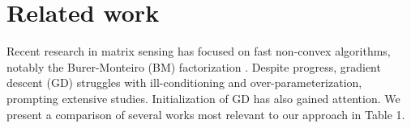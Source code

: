 \section{Related work}


Recent research in matrix sensing has focused on fast non-convex algorithms, notably the Burer-Monteiro (BM) factorization \cite{tu2016low,zhuo2024computational,chen2015fast,sun2016guaranteed}. Despite progress, gradient descent (GD) struggles with ill-conditioning and over-parameterization, prompting extensive studies. Initialization of GD has also gained attention. We present a comparison of several works most relevant to our approach in Table 1.

